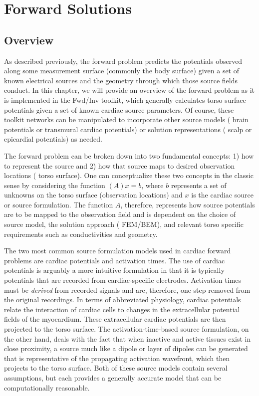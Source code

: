 \chapter{Forward Solutions}\label{ch:fwd}

\section{Overview}

As described previously, the forward problem predicts the potentials observed along some measurement surface (commonly the body surface) given a set of known electrical sources and the geometry through which those source fields conduct. In this chapter, we will provide an overview of the forward problem as it is implemented in the Fwd/Inv toolkit, which generally calculates torso surface potentials given a set of known cardiac source parameters. Of course, these toolkit networks can be manipulated to incorporate other source models (\eg{} brain potentials or transmural cardiac potentials) or solution representations (\eg{} scalp or epicardial potentials) as needed. 

The forward problem can be broken down into two fundamental concepts: 1) how to represent the source and 2) how that source maps to desired observation locations (\eg{} torso surface). One can conceptualize these two concepts in the classic sense by considering the function $(A)x = b$,  where $b$ represents a set of unknowns on the torso surface (observation locations) and $x$ is the cardiac source or source formulation. The function $A$, therefore, represents how source potentials are to be mapped to the observation field and is dependent on the choice of source model, the solution approach (\ie{} FEM/BEM), and relevant torso specific requirements such as conductivities and geometry.

The two most common source formulation models used in cardiac forward problems are cardiac potentials and activation times. The use of cardiac potentials is arguably a more intuitive formulation in that it is typically potentials that are recorded from cardiac-specific electrodes.  Activation times must be {\em derived} from recorded signals and are, therefore, one step removed from the original recordings.  In terms of abbreviated physiology, cardiac potentials relate the interaction of cardiac cells to changes in the extracellular potential fields of the myocardium. These extracellular cardiac potentials are then projected to the torso surface. The activation-time-based source formulation, on the other hand, deals with the fact that when inactive and active tissues exist in close proximity, a source much like a dipole or layer of dipoles can be generated that is representative of the propagating activation wavefront, which then projects to the torso surface. Both of these source models contain several assumptions, but each provides a generally accurate model that can be computationally reasonable.

